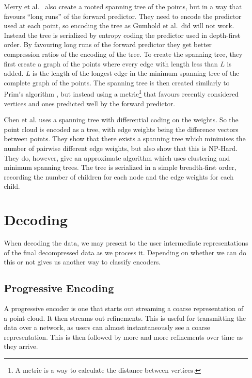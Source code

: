 \documentclass{report}
\begin{document}
Merry et al.~\cite{merrycomp} also create a rooted spanning tree of the
points, but in a way that favours ``long runs'' of the forward predictor. They
need to encode the predictor used at each point, so encoding the tree as
Gumhold et al.\ did will not work. Instead the tree is serialized by entropy
coding the predictor used in depth-first order. By favouring long runs of the
forward predictor they get better compression ratios of the encoding of the
tree. To create the spanning tree, they first create a graph of the points
where every edge with length less than $L$ is added. $L$ is the length of the
longest edge in the minimum spanning tree of the complete graph of the
points. The spanning tree is then created similarly to Prim's algorithm
\cite[p.\ 457]{sedgewick}, but instead using a metric\footnote{A metric is a
  way to calculate the distance between vertices.} that favours recently
considered vertices and ones predicted well by the forward predictor.

Chen et al.\cite{chen2005lcp} uses a spanning tree with differential coding on
the weights. So the point cloud is encoded as a tree, with edge weights being
the difference vectors between points. They show that there exists a spanning
tree which minimises the number of pairwise different edge weights, but also
show that this is NP-Hard. They do, however, give an approximate algorithm
which uses clustering and minimum spanning trees. The tree is serialized in a
simple breadth-first order, recording the number of children for each node and
the edge weights for each child.


\section{Decoding}

When decoding the data, we may present to the user intermediate
representations of the final decompressed data as we process it. Depending on
whether we can do this or not gives us another way to classify encoders.

\subsection{Progressive Encoding}

A progressive encoder is one that starts out streaming a coarse representation
of a point cloud. It then streams out refinements. This is useful for
transmitting the data over a network, as users can almost instantaneously see
a coarse representation. This is then followed by more and more refinements
over time as they arrive.
\end{document}
